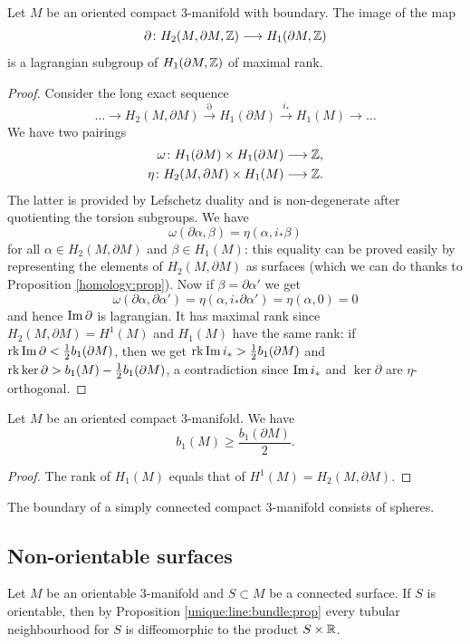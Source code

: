 \begin{prop}  \label{lagrangian:prop}
Let $M$ be an oriented compact 3-manifold with boundary. The image of the map 
$$\partial \colon H_2(M,\partial M, \mathbb{Z}) \longrightarrow H_1(\partial M,\mathbb{Z})$$
is a lagrangian subgroup of $H_1(\partial M, \mathbb{Z})$ of maximal rank.
\end{prop}
\begin{proof}
Consider the long exact sequence
$$\ldots \longrightarrow H_2(M,\partial M) \stackrel{\partial}\longrightarrow H_1(\partial M) \stackrel{i_*}\longrightarrow H_1(M) \longrightarrow \ldots$$
We have two pairings
\begin{align*}
\omega \colon H_1(\partial M) \times H_1(\partial M) & \longrightarrow  \mathbb{Z}, \\
\eta \colon H_2(M,\partial M) \times H_1(M) & \longrightarrow \mathbb{Z}.
\end{align*}
The latter is provided by Lefschetz duality and is non-degenerate after quotienting the torsion subgroups. We have
$$\omega (\partial \alpha, \beta) = \eta (\alpha, i_*\beta)$$
for all $\alpha \in H_2(M,\partial M)$ and $\beta \in H_1(M)$: this equality can be proved easily by representing the elements of $H_2(M,\partial M)$ as surfaces (which we can do thanks to Proposition \ref{homology:prop}). Now if $\beta = \partial\alpha'$ we get 
$$\omega(\partial \alpha, \partial \alpha') = \eta(\alpha, i_*\partial \alpha') = \eta(\alpha,0) = 0$$
and hence ${\rm Im\,} \partial$ is lagrangian. It has maximal rank since $H_2(M,\partial M)=H^1(M)$ and $H_1(M)$ have the same rank: if ${\rm rk}\, {\rm Im\,} \partial < \frac 12 b_1(\partial M)$, then we get ${\rm rk} \,{\rm Im\,} i_* > \frac 12 b_1(\partial M)$ and ${\rm rk} \ker\partial > b_1(M) - \frac 12 b_1(\partial M)$, a contradiction since ${\rm Im\,} i_*$ and $\ker\partial$ are $\eta$-orthogonal.
\end{proof}

\begin{cor} \label{rank:cor}
Let $M$ be an oriented compact 3-manifold. We have 
$$b_1(M)\geqslant \frac {b_1(\partial M)}2.$$
\end{cor}
\begin{proof}
The rank of $H_1(M)$ equals that of $H^1(M) = H_2(M,\partial M)$.
\end{proof}

\begin{cor}
The boundary of a simply connected compact 3-manifold consists of spheres.
\end{cor}

\subsection{Non-orientable surfaces}
Let $M$ be an orientable 3-manifold and $S\subset M$ be a connected surface. If $S$ is orientable, then by Proposition \ref{unique:line:bundle:prop} every tubular neighbourhood for $S$ is diffeomorphic to the product $S \times \mathbb{R}$.

